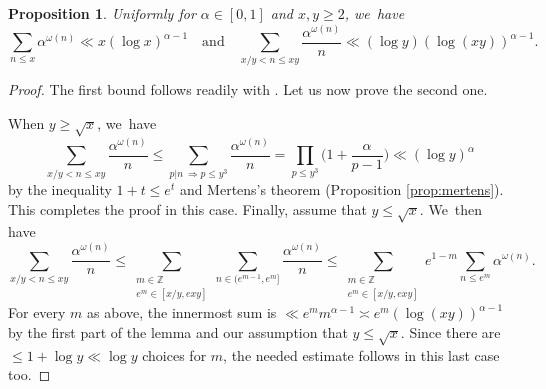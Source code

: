 \documentclass[10pt,a4paper]{article}
\newcommand{\ZZ}{\mathbb{Z}}
\newcommand{\bgg}{\Big}
\theoremstyle{plain}
\newtheorem{prop}[cor]{Proposition}
\theoremstyle{definition}
\begin{document}
\begin{prop}
\label{prel:partial summation bounds}
Uniformly for $\alpha\in[0,1]$ and $x,y\ge2$, we~have
\[
\sum_{n \le x} \alpha^{\omega(n)} \ll x(\log x)^{\alpha-1}
\quad \text{and} \quad \sum_{x/y<n \le xy} \frac{ \alpha^{\omega(n)}}{n} \ll (\log y)(\log(xy))^{\alpha-1}.
\]
\end{prop}

\begin{proof}The first bound follows readily with \cite[Th.\,14.2]{Koukoulo19}. Let us now prove the second one.

When $y\ge \sqrt{x}$, we~have
\[
\sum_{x/y<n \le xy} \frac{ \alpha^{\omega(n)}}{n}\le \sum_{p|n\ \Rightarrow p \le y^3} \frac{ \alpha^{\omega(n)}}{n} = \prod_{p\le y^3} \bgg(1+\frac{\alpha}{p-1}\bgg) \ll (\log y)^\alpha
\]
by the inequality $1+t\le e^t$ and Mertens's theorem (Proposition \ref{prop:mertens}). This completes the proof in this case. Finally, assume that $y\le \sqrt{x}$. We~then have
\[
\sum_{x/y<n \le xy} \frac{ \alpha^{\omega(n)}}{n}
\le \sum_{\substack{m\in\ZZ \\ e^m\in[x/y,exy]}} \sum_{n\in(e^{m-1},e^m]} \frac{ \alpha^{\omega(n)}}{n}
\le \sum_{\substack{m\in\ZZ \\ e^m\in[x/y,exy]}} e^{1-m} \sum_{n\le e^m} \alpha^{\omega(n)}.
\]
For every $m$ as above, the innermost sum is $\ll e^m m^{\alpha-1} \asymp e^m (\log(xy))^{\alpha-1}$ by the first part of the lemma and our assumption that $y\le \sqrt{x}$. Since there are $\le1+\log y\ll \log y$ choices for $m$, the needed estimate follows in this last case too.
\end{proof}
\end{document}
